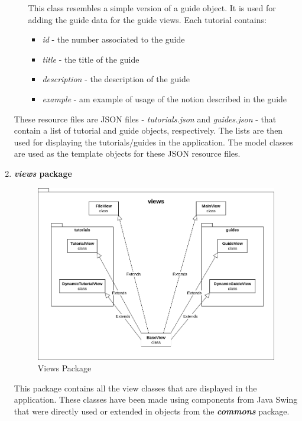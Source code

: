 \documentclass[12pt,a4paper,twoside]{report}
\begin{document}
\begin{enumerate}
\begin{itemize}
    This class resembles a simple version of a guide object. It is used for adding the guide data for the guide views. Each tutorial contains:
    \begin{itemize}
        \item \textit{id} - the number associated to the guide
        \item \textit{title} - the title of the guide
        \item \textit{description} - the description of the guide
        \item \textit{example} - am example of usage of the notion described in the guide
    \end{itemize}
\end{itemize}
These resource files are JSON files - \textit{tutorials.json} and \textit{guides.json} - that contain a list of tutorial and guide objects, respectively. The lists are then used for displaying the tutorials/guides in the application. The model classes are used as the template objects for these JSON resource files.

\item \textbf{\textit{views} package}

\begin{figure}[H]
    \centering
    \includegraphics[width=0.8\linewidth]{img/ViewsPackage.png}
    \caption{Views Package}
    \label{fig:conf}
\end{figure}

This package contains all the view classes that are displayed in the application. These classes have been made using components from Java Swing that were directly used or extended in objects from the \textbf{\textit{commons}} package.


\end{enumerate}
\end{document}
